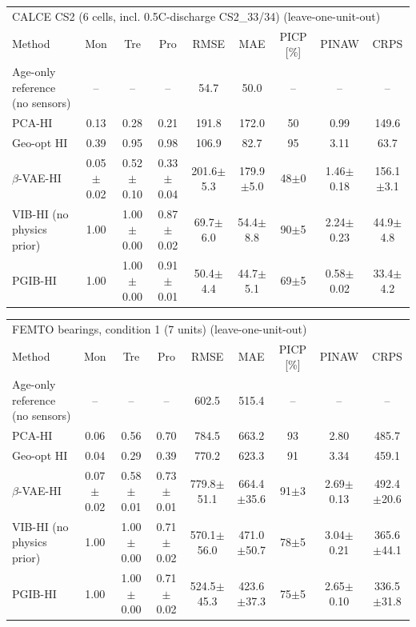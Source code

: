 \begin{tabular}{l c c c c c c c c}
\hline
\multicolumn{9}{l}{CALCE CS2 (6 cells, incl. 0.5C-discharge CS2\_33/34) (leave-one-unit-out)}\\
 Method & Mon & Tre & Pro & RMSE & MAE & PICP [\%] & PINAW & CRPS \\
\hline
Age-only reference (no sensors) & -- & -- & -- & 54.7 & 50.0 & -- & -- & -- \\
PCA-HI & 0.13 & 0.28 & 0.21 & 191.8 & 172.0 & 50 & 0.99 & 149.6 \\
Geo-opt HI & 0.39 & 0.95 & 0.98 & 106.9 & 82.7 & 95 & 3.11 & 63.7 \\
$\beta$-VAE-HI & 0.05$\pm$0.02 & 0.52$\pm$0.10 & 0.33$\pm$0.04 & 201.6$\pm$5.3 & 179.9$\pm$5.0 & 48$\pm$0 & 1.46$\pm$0.18 & 156.1$\pm$3.1 \\
VIB-HI (no physics prior) & 1.00 & 1.00$\pm$0.00 & 0.87$\pm$0.02 & 69.7$\pm$6.0 & 54.4$\pm$8.8 & 90$\pm$5 & 2.24$\pm$0.23 & 44.9$\pm$4.8 \\
PGIB-HI & 1.00 & 1.00$\pm$0.00 & 0.91$\pm$0.01 & 50.4$\pm$4.4 & 44.7$\pm$5.1 & 69$\pm$5 & 0.58$\pm$0.02 & 33.4$\pm$4.2 \\
\hline
\end{tabular}
\begin{tabular}{l c c c c c c c c}
\hline
\multicolumn{9}{l}{FEMTO bearings, condition 1 (7 units) (leave-one-unit-out)}\\
 Method & Mon & Tre & Pro & RMSE & MAE & PICP [\%] & PINAW & CRPS \\
\hline
Age-only reference (no sensors) & -- & -- & -- & 602.5 & 515.4 & -- & -- & -- \\
PCA-HI & 0.06 & 0.56 & 0.70 & 784.5 & 663.2 & 93 & 2.80 & 485.7 \\
Geo-opt HI & 0.04 & 0.29 & 0.39 & 770.2 & 623.3 & 91 & 3.34 & 459.1 \\
$\beta$-VAE-HI & 0.07$\pm$0.02 & 0.58$\pm$0.01 & 0.73$\pm$0.01 & 779.8$\pm$51.1 & 664.4$\pm$35.6 & 91$\pm$3 & 2.69$\pm$0.13 & 492.4$\pm$20.6 \\
VIB-HI (no physics prior) & 1.00 & 1.00$\pm$0.00 & 0.71$\pm$0.02 & 570.1$\pm$56.0 & 471.0$\pm$50.7 & 78$\pm$5 & 3.04$\pm$0.21 & 365.6$\pm$44.1 \\
PGIB-HI & 1.00 & 1.00$\pm$0.00 & 0.71$\pm$0.02 & 524.5$\pm$45.3 & 423.6$\pm$37.3 & 75$\pm$5 & 2.65$\pm$0.10 & 336.5$\pm$31.8 \\
\hline
\end{tabular}
